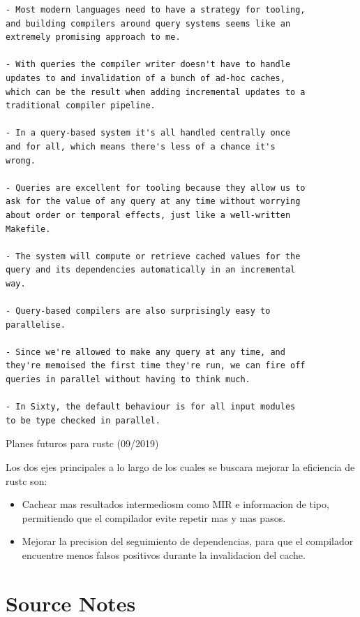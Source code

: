 \documentclass[12pt, a4paper]{report}
\begin{document}
\begin{verbatim}
- Most modern languages need to have a strategy for tooling,
and building compilers around query systems seems like an
extremely promising approach to me.

- With queries the compiler writer doesn't have to handle
updates to and invalidation of a bunch of ad-hoc caches,
which can be the result when adding incremental updates to a
traditional compiler pipeline.

- In a query-based system it's all handled centrally once
and for all, which means there's less of a chance it's
wrong.

- Queries are excellent for tooling because they allow us to
ask for the value of any query at any time without worrying
about order or temporal effects, just like a well-written
Makefile.

- The system will compute or retrieve cached values for the
query and its dependencies automatically in an incremental
way.

- Query-based compilers are also surprisingly easy to
parallelise.

- Since we're allowed to make any query at any time, and
they're memoised the first time they're run, we can fire off
queries in parallel without having to think much.

- In Sixty, the default behaviour is for all input modules
to be type checked in parallel.
\end{verbatim}
\cite{olle_query_based}

Planes futuros para rustc (09/2019)

Los dos ejes principales a lo largo de los cuales se buscara mejorar la eficiencia de rustc son:
\begin{itemize}[noitemsep]
\item Cachear mas resultados intermediosm como MIR e informacion de tipo, permitiendo que el compilador evite repetir mas y mas pasos.
\item Mejorar la precision del seguimiento de dependencias, para que el compilador encuentre menos falsos positivos durante la invalidacion del cache.
\end{itemize}
\cite{rust_blog_incremental_compilation}

\chapter*{Source Notes}

\end{document}
